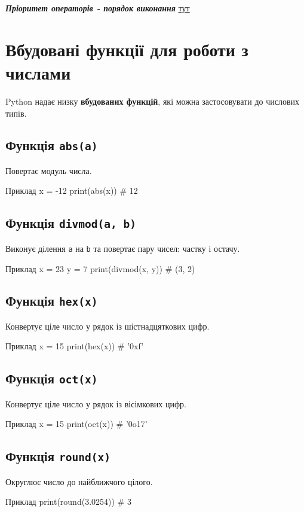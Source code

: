 	
	
	
	\emph{\textbf{Пріоритет операторів - порядок виконання  }}\href{https://pythonguide.rozh2sch.org.ua/#operators-priority}{тут}
	
	\section{Вбудовані функції для роботи з числами}
	
	Python надає низку \textbf{вбудованих функцій}, які можна застосовувати до числових типів.
	
	\subsection*{Функція \texttt{abs(a)}}
	Повертає модуль числа.
	\begin{py}{Приклад}
x = -12
print(abs(x))   # 12
	\end{py}
	
	\subsection*{Функція \texttt{divmod(a, b)}}
	Виконує ділення \texttt{a} на \texttt{b} та повертає пару чисел: частку і остачу.
	\begin{py}{Приклад}
x = 23
y = 7
print(divmod(x, y))   # (3, 2)
	\end{py}
	
	\subsection*{Функція \texttt{hex(x)}}
	Конвертує ціле число у рядок із шістнадцяткових цифр.
	\begin{py}{Приклад}
x = 15
print(hex(x))   # '0xf'
	\end{py}
	
	\subsection*{Функція \texttt{oct(x)}}
	Конвертує ціле число у рядок із вісімкових цифр.
	\begin{py}{Приклад}
x = 15
print(oct(x))   # '0o17'
	\end{py}
	
	\subsection*{Функція \texttt{round(x)}}
	Округлює число до найближчого цілого.
	\begin{py}{Приклад}
print(round(3.0254))   # 3
	\end{py}
	
